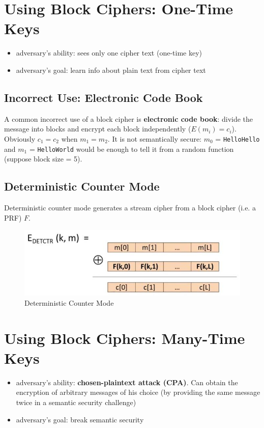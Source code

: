 \section{Using Block Ciphers: One-Time Keys}
\begin{itemize}
\item adversary's ability: sees only one cipher text (one-time key)
\item adversary's goal: learn info about plain text from cipher text
\end{itemize}

\subsection{Incorrect Use: Electronic Code Book}
A common incorrect use of a block cipher is \textbf{electronic code book}: divide the message into blocks and encrypt each block independently ($E(m_i) = c_i$). Obviously $c_1 = c_2$ when $m_1=m_2$. It is not semantically secure: $m_0$ = \texttt{HelloHello} and $m_1$ = \texttt{HelloWorld} would be enough to tell it from a random function (suppose block size = 5).
\subsection{Deterministic Counter Mode}
Deterministic counter mode generates a stream cipher from a block cipher (i.e. a PRF) $F$.
\begin{figure}[ht]
  \centering
  \includegraphics[width=\textwidth]{detctr.jpg}
  \caption{Deterministic Counter Mode}\label{detctr}
\end{figure}

\section{Using Block Ciphers: Many-Time Keys}
\begin{itemize}
  \item adversary's ability: \textbf{chosen-plaintext attack (CPA)}. Can obtain the encryption of arbitrary messages of his choice (by providing the same message twice in a semantic security challenge)
  \item adversary's goal: break semantic security
\end{itemize}

